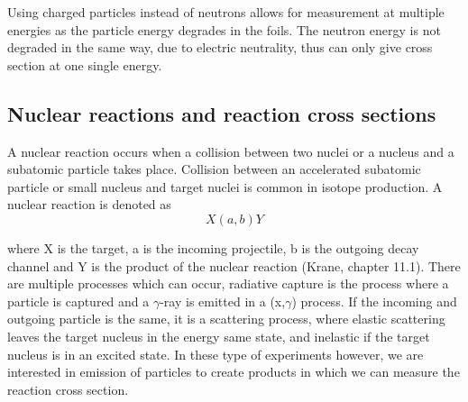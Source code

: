 Using charged particles instead of neutrons allows for measurement at multiple energies as the particle energy degrades in the foils. The neutron energy is not degraded in the same way, due to electric neutrality, thus can only give cross section at one single energy. 







\subsection{Nuclear reactions and reaction cross sections}

A nuclear reaction occurs when a collision between two nuclei or a nucleus and a subatomic particle takes place. Collision between an accelerated subatomic particle or small nucleus and target nuclei is common in isotope production. A nuclear reaction is denoted as
\begin{equation}
    X(a,b)Y
\end{equation}

\noindent where X is the target, a is the incoming projectile, b is the outgoing decay channel and Y is the product of the nuclear reaction (Krane, chapter 11.1). There are multiple processes which can occur, radiative capture is the process where a particle is captured and a $\gamma$-ray is emitted in a (x,$\gamma$) process. If the incoming and outgoing particle is the same, it is a scattering process, where elastic scattering leaves the target nucleus in the energy same state, and inelastic if the target nucleus is in an excited state. In these type of experiments however, we are interested in emission of particles to create products in which we can measure the reaction cross section. \\

